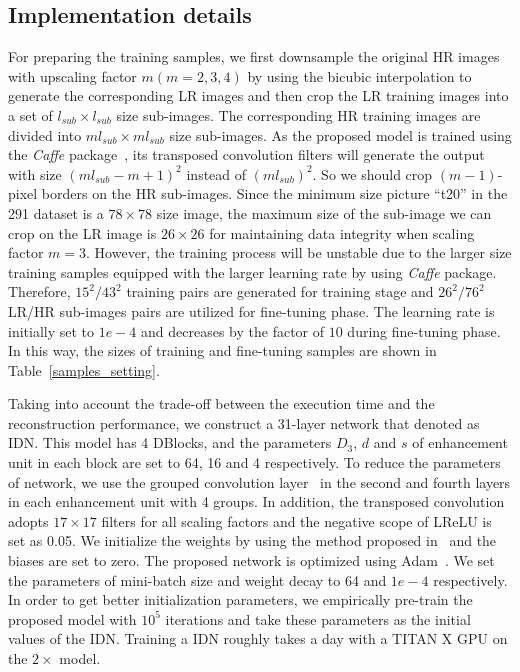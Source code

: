 \documentclass[10pt,twocolumn,letterpaper]{article}
\begin{document}
\subsection{Implementation details}
For preparing the training samples, we first downsample the original HR images with upscaling factor $m\left( {m = 2,3,4} \right)$ by using the bicubic interpolation to generate the corresponding LR images and then crop the LR training images into a set of $ {l_{sub}} \times {l_{sub}}$ size sub-images. The corresponding HR training images are divided into $m{l_{sub}} \times m{l_{sub}}$ size sub-images. As the proposed model is trained using the \emph{Caffe} package~\cite{Caffe}, its transposed convolution filters will generate the output with size ${\left( {m{l_{sub}} - m + 1} \right)^2}$ instead of ${\left( {m{l_{sub}}} \right)^2}$. So we should crop $\left( {m - 1} \right)$-pixel borders on the HR sub-images. Since the minimum size picture ``t20'' in the 291 dataset is a $78 \times 78$ size image, the maximum size of the sub-image we can crop on the LR image is $26 \times 26$ for maintaining data integrity when scaling factor $m=3$. However, the training process will be unstable due to the larger size training samples equipped with the larger learning rate by using \emph{Caffe} package. Therefore, ${15^2}/{43^2}$ training pairs are generated for training stage and ${26^2}/{76^2}$ LR/HR sub-images pairs are utilized for fine-tuning phase. The learning rate is initially set to $1e-4$ and decreases by the factor of $10$ during fine-tuning phase. In this way, the sizes of training and fine-tuning samples are shown in Table~\ref{samples_setting}.

Taking into account the trade-off between the execution time and the reconstruction performance, we construct a 31-layer network that denoted as IDN. This model has 4 DBlocks, and the parameters ${D_3}$, $d$ and $s$ of enhancement unit in each block are set to 64, 16 and 4 respectively. To reduce the parameters of network, we use the grouped convolution layer~\cite{Xception,ResNeXt} in the second and fourth layers in each enhancement unit with 4 groups. In addition, the transposed convolution adopts $17 \times17$ filters for all scaling factors and the negative scope of LReLU is set as 0.05. We initialize the weights by using the method proposed in~\cite{Msra} and the biases are set to zero. The proposed network is optimized using Adam~\cite{Adam}. We set the parameters of mini-batch size and weight decay to 64 and $1e-4$ respectively. In order to get better initialization parameters, we empirically pre-train the proposed model with ${10^5}$ iterations and take these parameters as the initial values of the IDN. Training a IDN roughly takes a day with a TITAN X GPU on the $2 \times$ model.
\end{document}
